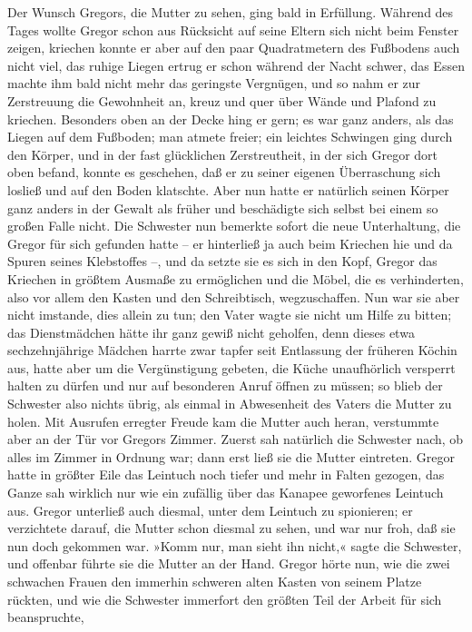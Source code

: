 Der Wunsch Gregors, die Mutter zu sehen, ging bald in Erfüllung. Während
des Tages wollte Gregor schon aus Rücksicht auf seine Eltern sich nicht
beim Fenster zeigen, kriechen konnte er aber auf den paar Quadratmetern
des Fußbodens auch nicht viel, das ruhige Liegen ertrug er schon während
der Nacht schwer, das Essen machte ihm bald nicht mehr das geringste
Vergnügen, und so nahm er zur Zerstreuung die Gewohnheit an, kreuz und
quer über Wände und Plafond zu kriechen. Besonders oben an der Decke
hing er gern; es war ganz anders, als das Liegen auf dem Fußboden; man
atmete freier; ein leichtes Schwingen ging durch den Körper, und in der
fast glücklichen Zerstreutheit, in der sich Gregor dort oben befand,
konnte es geschehen, daß er zu seiner eigenen Überraschung sich losließ
und auf den Boden klatschte. Aber nun hatte er natürlich seinen Körper
ganz anders in der Gewalt als früher und beschädigte sich selbst bei
einem so großen Falle nicht. Die Schwester nun bemerkte sofort die neue
Unterhaltung, die Gregor für sich gefunden hatte -- er hinterließ ja
auch beim Kriechen hie und da Spuren seines Klebstoffes --, und da
setzte sie es sich in den Kopf, Gregor das Kriechen in größtem Ausmaße
zu ermöglichen und die Möbel, die es verhinderten, also vor allem den
Kasten und den Schreibtisch, wegzuschaffen. Nun war sie aber nicht
imstande, dies allein zu tun; den Vater wagte sie nicht um Hilfe zu
bitten; das Dienstmädchen hätte ihr ganz gewiß nicht geholfen, denn
dieses etwa sechzehnjährige Mädchen harrte zwar tapfer seit Entlassung
der früheren Köchin aus, hatte aber um die Vergünstigung gebeten, die
Küche unaufhörlich versperrt halten zu dürfen und nur auf besonderen
Anruf öffnen zu müssen; so blieb der Schwester also nichts übrig, als
einmal in Abwesenheit des Vaters die Mutter zu holen. Mit Ausrufen
erregter Freude kam die Mutter auch heran, verstummte aber an der Tür
vor Gregors Zimmer. Zuerst sah natürlich die Schwester nach, ob alles im
Zimmer in Ordnung war; dann erst ließ sie die Mutter eintreten. Gregor
hatte in größter Eile das Leintuch noch tiefer und mehr in Falten
gezogen, das Ganze sah wirklich nur wie ein zufällig über das Kanapee
geworfenes Leintuch aus. Gregor unterließ auch diesmal, unter dem
Leintuch zu spionieren; er verzichtete darauf, die Mutter schon diesmal
zu sehen, und war nur froh, daß sie nun doch gekommen war. »Komm nur,
man sieht ihn nicht,« sagte die Schwester, und offenbar führte sie die
Mutter an der Hand. Gregor hörte nun, wie die zwei schwachen Frauen den
immerhin schweren alten Kasten von seinem Platze rückten, und wie die
Schwester immerfort den größten Teil der Arbeit für sich beanspruchte,
